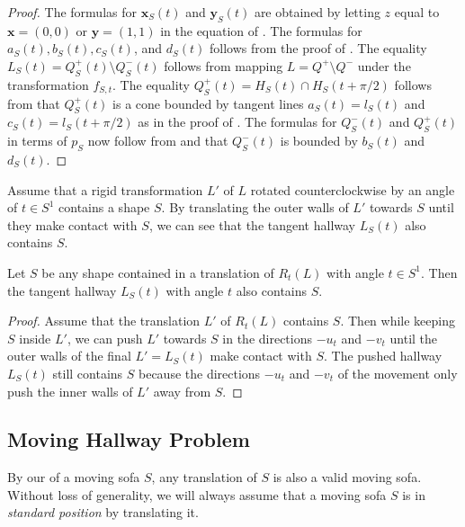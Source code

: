 \begin{proof}
The formulas for \(\mathbf{x}_S(t)\) and \(\mathbf{y}_S(t)\) are obtained by letting \(z\) equal to \(\mathbf{x} = (0, 0)\) or \(\mathbf{y} = (1, 1)\) in the equation of . The formulas for \(a_S(t), b_S(t), c_S(t)\), and \(d_S(t)\) follows from the proof of . The equality \(L_S(t) = Q_S^+(t) \setminus Q_S^-(t)\) follows from mapping \(L = Q^+ \setminus Q^-\) under the transformation \(f_{S, t}\). The equality \(Q^+_S(t) = H_S(t) \cap H_S(t + \pi/2)\) follows from that \(Q^+_S(t)\) is a cone bounded by tangent lines \(a_S(t) = l_S(t)\) and \(c_S(t) = l_S(t + \pi/2)\) as in the proof of . The formulas for \(Q_S^-(t)\) and \(Q_S^+(t)\) in terms of \(p_S\) now follow from  and that \(Q_S^-(t)\) is bounded by \(b_S(t)\) and \(d_S(t)\).
\end{proof}

Assume that a rigid transformation \(L'\) of \(L\) rotated counterclockwise by an angle of \(t \in S^1\) contains a shape \(S\). By translating the outer walls of \(L'\) towards \(S\) until they make contact with \(S\), we can see that the tangent hallway \(L_S(t)\) also contains \(S\).

\begin{proposition}

Let \(S\) be any shape contained in a translation of \(R_t(L)\) with angle \(t \in S^1\). Then the tangent hallway \(L_S(t)\) with angle \(t\) also contains \(S\).

\label{pro:tangent-hallway-contains}
\end{proposition}

\begin{proof}
Assume that the translation \(L'\) of \(R_t(L)\) contains \(S\). Then while keeping \(S\) inside \(L'\), we can push \(L'\) towards \(S\) in the directions \(-u_t\) and \(-v_t\) until the outer walls of the final \(L' = L_S(t)\) make contact with \(S\). The pushed hallway \(L_S(t)\) still contains \(S\) because the directions \(-u_t\) and \(-v_t\) of the movement only push the inner walls of \(L'\) away from \(S\).
\end{proof}

\subsection{Moving Hallway Problem}

By our  of a moving sofa \(S\), any translation of \(S\) is also a valid moving sofa. Without loss of generality, we will always assume that a moving sofa \(S\) is in \emph{standard position} by translating it.

